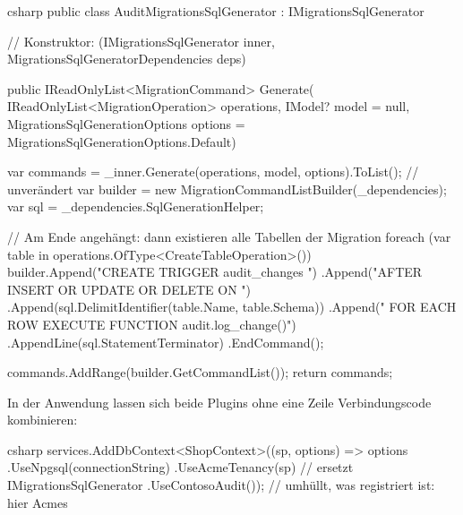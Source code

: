 \begin{sourcecode}{csharp}
public class AuditMigrationsSqlGenerator : IMigrationsSqlGenerator
{
    // Konstruktor: (IMigrationsSqlGenerator inner, MigrationsSqlGeneratorDependencies deps)

    public IReadOnlyList<MigrationCommand> Generate(
        IReadOnlyList<MigrationOperation> operations,
        IModel? model = null,
        MigrationsSqlGenerationOptions options = MigrationsSqlGenerationOptions.Default)
    {
        var commands = _inner.Generate(operations, model, options).ToList();   // unverändert
        var builder = new MigrationCommandListBuilder(_dependencies);
        var sql = _dependencies.SqlGenerationHelper;

        // Am Ende angehängt: dann existieren alle Tabellen der Migration
        foreach (var table in operations.OfType<CreateTableOperation>())
        {
            builder.Append("CREATE TRIGGER audit_changes ")
                .Append("AFTER INSERT OR UPDATE OR DELETE ON ")
                .Append(sql.DelimitIdentifier(table.Name, table.Schema))
                .Append(" FOR EACH ROW EXECUTE FUNCTION audit.log_change()")
                .AppendLine(sql.StatementTerminator)
                .EndCommand();
        }

        commands.AddRange(builder.GetCommandList());
        return commands;
    }
}
\end{sourcecode}

In der Anwendung lassen sich beide Plugins ohne eine Zeile Verbindungscode kombinieren:

\begin{sourcecode}{csharp}
services.AddDbContext<ShopContext>((sp, options) => options
    .UseNpgsql(connectionString)
    .UseAcmeTenancy(sp)       // ersetzt IMigrationsSqlGenerator
    .UseContosoAudit());      // umhüllt, was registriert ist: hier Acmes
\end{sourcecode}

